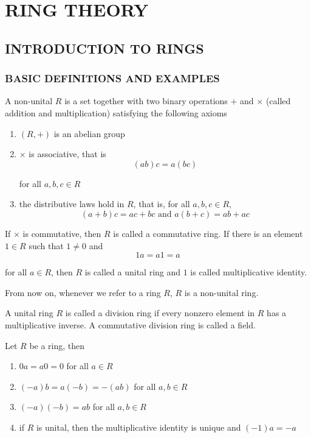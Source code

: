\chapter{RING THEORY}

\section{INTRODUCTION TO RINGS}

\subsection{BASIC DEFINITIONS AND EXAMPLES}

\begin{definition}[ring]
	A non-unital $R$ is a set together with two binary operations $+$ and $\times$ (called addition and multiplication) satisfying the following axioms
	\begin{enumerate}
		\item $(R, +)$ is an abelian group
		\item $\times$ is associative, that is
		$$
			(ab) c = a (bc)
		$$
		
		for all $a, b, c \in R$
		
		\item the distributive laws hold in $R$, that is, for all $a, b, c \in R$, 
		$$
			(a + b)c = ac + bc \text{ and } a(b+c) = ab + ac
		$$
	\end{enumerate}
	
	If $\times$ is commutative, then $R$ is called a commutative ring. If there is an element $1 \in R$ such that $1 \neq 0$ and
	$$
		1a = a1 = a
	$$
	
	for all $a \in R$, then $R$ is called a unital ring and $1$ is called multiplicative identity.
\end{definition}

\begin{remark}
	From now on, whenever we refer to a ring $R$, $R$ is a non-unital ring.
\end{remark}

\begin{definition}
	A unital ring $R$ is called a division ring if every nonzero element in $R$ has a multiplicative inverse. A commutative division ring is called a field.
\end{definition}

\begin{proposition}
	Let $R$ be a ring, then
	\begin{enumerate}
		\item $0a = a0 = 0$ for all $a \in R$
		\item $(-a)b = a(-b) = -(ab)$ for all $a, b \in R$
		\item $(-a)(-b) = ab$ for all $a, b \in R$
		\item if $R$ is unital, then the multiplicative identity is unique and $(-1)a = -a$
	\end{enumerate}
\end{proposition}

